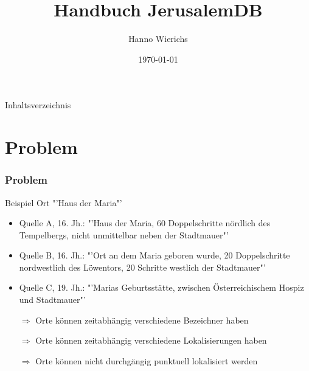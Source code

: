 \documentclass{beamer}
\title{Handbuch JerusalemDB}
\author{Hanno Wierichs}
\institute{}
\date{\today}
\begin{document}
	\begin{frame}[plain]
		\titlepage
	\end{frame}

	\begin{frame}{Inhaltsverzeichnis}
		\tableofcontents
	\end{frame} 


\section{Problem} 
		\begin{frame}
			\frametitle{Problem}
			Beispiel Ort "'Haus der Maria"'
					\begin{itemize}
						\item Quelle A, 16. Jh.: "'Haus der Maria, 60 Doppelschritte nördlich des Tempelbergs, nicht unmittelbar neben der Stadtmauer"'
						\item Quelle B, 16. Jh.: "'Ort an dem Maria geboren wurde, 20 Doppelschritte nordwestlich des Löwentors, 20 Schritte westlich der Stadtmauer"'
						\item Quelle C, 19. Jh.: "'Marias Geburtsstätte, zwischen Österreichischem Hospiz und Stadtmauer"'
					\end{itemize}					 
					\vspace{1ex}
					\begin{itemize}
						\item[$\Rightarrow$] Orte können zeitabhängig verschiedene Bezeichner haben
						\item[$\Rightarrow$] Orte können zeitabhängig verschiedene Lokalisierungen haben
						\item[$\Rightarrow$] Orte können nicht durchgängig punktuell lokalisiert werden	
					\end{itemize}					 					
	\end{frame}
	
	
\end{document}

